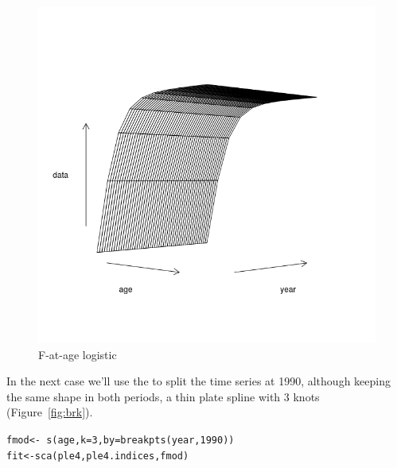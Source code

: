 \documentclass[a4paper,english,10pt]{article}\usepackage[]{graphicx}\usepackage[]{color}
\makeatletter
\newcommand{\hlnum}[1]{\textcolor[rgb]{0.063,0.58,0.627}{#1}}%
\newcommand{\hlopt}[1]{\textcolor[rgb]{0.196,0.196,0.196}{#1}}%
\newcommand{\hlstd}[1]{\textcolor[rgb]{0.196,0.196,0.196}{#1}}%
\newcommand{\hlkwb}[1]{\textcolor[rgb]{0.627,0,0.314}{#1}}%
\newcommand{\hlkwc}[1]{\textcolor[rgb]{0,0.631,0.314}{#1}}%
\newcommand{\hlkwd}[1]{\textcolor[rgb]{0.78,0.227,0.412}{#1}}%
\newenvironment{kframe}{%
 \def\at@end@of@kframe{}%
 \ifinner\ifhmode%
  \def\at@end@of@kframe{\end{minipage}}%
  \begin{minipage}{\columnwidth}%
 \fi\fi%
 \def\FrameCommand##1{\hskip\@totalleftmargin \hskip-\fboxsep
 \colorbox{shadecolor}{##1}\hskip-\fboxsep
     \hskip-\linewidth \hskip-\@totalleftmargin \hskip\columnwidth}%
 \MakeFramed {\advance\hsize-\width
   \@totalleftmargin\z@ \linewidth\hsize
   \@setminipage}}%
 {\par\unskip\endMakeFramed%
 \at@end@of@kframe}
\newenvironment{knitrout}{}{} %
\makeatother
\begin{document}
\begin{knitrout}
\color{fgcolor}\begin{figure}[H]

{\centering \includegraphics[width=.9\linewidth]{figure/logistic-1} 

}

\caption[F-at-age logistic]{F-at-age logistic}\label{fig:logistic}
\end{figure}


\end{knitrout}

In the next case we'll use the  to split the time series at 1990, although keeping the same shape in both periods, a thin plate spline with 3 knots (Figure~\ref{fig:brk}).

\begin{knitrout}
\color{fgcolor}\begin{kframe}
\begin{alltt}
\hlstd{fmod} \hlkwb{<-} \hlopt{~}\hlkwd{s}\hlstd{(age,} \hlkwc{k} \hlstd{=} \hlnum{3}\hlstd{,} \hlkwc{by} \hlstd{=} \hlkwd{breakpts}\hlstd{(year,} \hlnum{1990}\hlstd{))}
\hlstd{fit} \hlkwb{<-} \hlkwd{sca}\hlstd{(ple4, ple4.indices, fmod)}
\end{alltt}
\end{kframe}
\end{knitrout}
\end{document}
